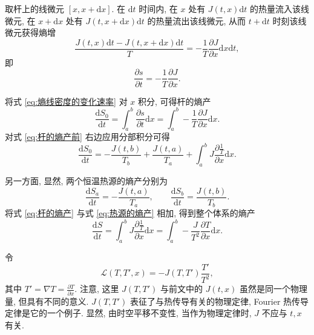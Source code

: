 \documentclass{article}
\begin{document}
取杆上的线微元 $\left[x,x+\mathrm dx\right]$.
在 $\mathrm dt$ 时间内, 在 $x$ 处有 $J\left(t,x\right)\mathrm dt$ 的热量流入该线微元,
在 $x+\mathrm dx$ 处有 $J\left(t,x+\mathrm dx\right)\mathrm dt$ 的热量流出该线微元,
从而 $t+\mathrm dt$ 时刻该线微元获得熵增
\begin{equation}
\frac{J\left(t,x\right)\mathrm dt-J\left(t,x+\mathrm dx\right)\mathrm dt}{T}=-\frac1T\frac{\partial J}{\partial x}\mathrm dx\mathrm dt,
\end{equation}
即
\begin{equation}
\frac{\partial s}{\partial t}=-\frac1T\frac{\partial J}{\partial x}.
\label{eq:熵线密度的变化速率}
\end{equation}

将式 \ref{eq:熵线密度的变化速率} 对 $x$ 积分, 可得杆的熵产
\begin{equation}
\frac{\mathrm dS_0}{\mathrm dt}=\int_a^b\frac{\partial s}{\partial t}\mathrm dx=\int_a^b-\frac1T\frac{\partial J}{\partial x}\mathrm dx.
\label{eq:杆的熵产前}
\end{equation}
对式 \ref{eq:杆的熵产前} 右边应用分部积分可得
\begin{equation}
\frac{\mathrm dS_0}{\mathrm dt}=-\frac{J\left(t,b\right)}{T_b}+\frac{J\left(t,a\right)}{T_a}+\int_a^bJ\frac{\partial\frac1T}{\partial x}\mathrm dx.
\label{eq:杆的熵产}
\end{equation}

另一方面, 显然, 两个恒温热源的熵产分别为
\begin{equation}
\frac{\mathrm dS_a}{\mathrm dt}=-\frac{J\left(t,a\right)}{T_a},\qquad
\frac{\mathrm dS_b}{\mathrm dt}=\frac{J\left(t,b\right)}{T_b}.
\label{eq:热源的熵产}
\end{equation}
将式 \ref{eq:杆的熵产} 与式 \ref{eq:热源的熵产} 相加, 得到整个体系的熵产
\begin{equation}
\frac{\mathrm dS}{\mathrm dt}=\int_a^bJ\frac{\partial\frac1T}{\partial x}\mathrm dx=\int_a^b-\frac{J}{T^2}\frac{\partial T}{\partial x}\mathrm dx.
\label{eq:整个体系的熵产}
\end{equation}

令
\begin{equation}
\mathcal L\left(T,T',x\right)=-J\left(T,T'\right)\frac{T'}{T^2},
\label{eq:lagrangian}
\end{equation}
其中 $T'=\nabla T=\frac{\partial T}{\partial x}$.
注意, 这里 $J\left(T,T'\right)$ 与前文中的 $J\left(t,x\right)$ 虽然是同一个物理量, 但具有不同的意义.
$J\left(T,T'\right)$ 表征了与热传导有关的物理定律, Fourier 热传导定律是它的一个例子.
显然, 由时空平移不变性, 当作为物理定律时, $J$ 不应与 $t,x$ 有关.
\end{document}
